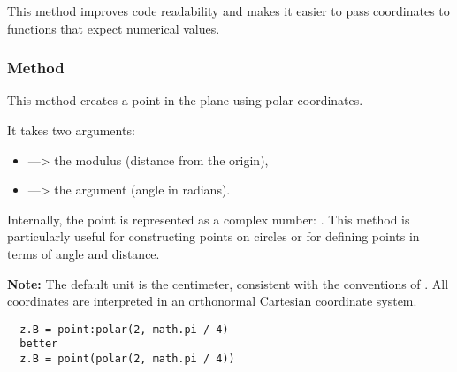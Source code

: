 \noindent
This method improves code readability and makes it easier to pass coordinates to functions that expect numerical values.

\vspace{1em}

\begin{minipage}{.5\textwidth-1cm}
\end{minipage}
\begin{minipage}{.5\textwidth}
\begin{tkzexample}
\end{tkzexample}
\end{minipage}

\subsubsection{Method }
\label{ssub:method_point_polar}

This method creates a point in the plane using polar coordinates.

\medskip
\noindent
It takes two arguments:
\begin{itemize}
  \item {} —> the modulus (distance from the origin),
  \item {} —> the argument (angle in radians).
\end{itemize}

\noindent
Internally, the point is represented as a complex number: . This method is particularly useful for constructing points on circles or for defining points in terms of angle and distance.

\medskip
\noindent
\textbf{Note:} The default unit is the centimeter, consistent with the conventions of . All coordinates are interpreted in an orthonormal Cartesian coordinate system.

\vspace{1em}

\begin{mybox}
\begin{verbatim}
  z.B = point:polar(2, math.pi / 4)
  better
  z.B = point(polar(2, math.pi / 4))
\end{verbatim}
\end{mybox}

